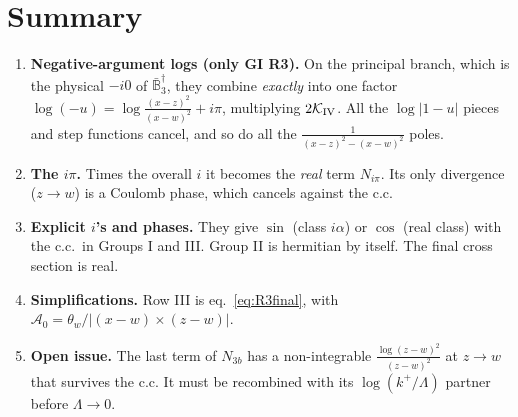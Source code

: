 \documentclass[10pt]{article}
\numberwithin{equation}{section}
\newcommand{\red}[1]{{\color{red}#1}}
\begin{document}
\section{Summary}
\begin{enumerate}
\item \textbf{Negative-argument logs (only GI R3).} On the principal branch, which is the physical $-i0$ of $\bar{\mathbb B}_{3}^{\dagger}$, they combine \emph{exactly} into one factor $\log(-u)=\log\frac{(x-z)^{2}}{(x-w)^{2}}+i\pi$, multiplying $2\mathcal K_{\rm IV}$. All the $\log|1-u|$ pieces and step functions cancel, and so do all the $\frac{1}{(x-z)^{2}-(x-w)^{2}}$ poles.
\item \textbf{The $i\pi$.} Times the overall $i$ it becomes the \emph{real} term $N_{i\pi}$. Its only divergence ($z\to w$) is a Coulomb phase, which cancels against the c.c.
\item \textbf{Explicit $i$'s and phases.} They give $\sin$ (class $i\alpha$) or $\cos$ (real class) with the c.c.\ in Groups I and III. Group II is hermitian by itself. The final cross section is real.
\item \textbf{Simplifications.} Row III is eq.~\eqref{eq:R3final}, with $\mathcal A_{0}=\theta_{w}/|(x-w)\times(z-w)|$.
\item \red{\textbf{Open issue.} The last term of $N_{3b}$ has a non-integrable $\frac{\log(z-w)^{2}}{(z-w)^{2}}$ at $z\to w$ that survives the c.c. It must be recombined with its $\log(k^{+}/\Lambda)$ partner before $\Lambda\to0$.}
\end{enumerate}
\end{document}
